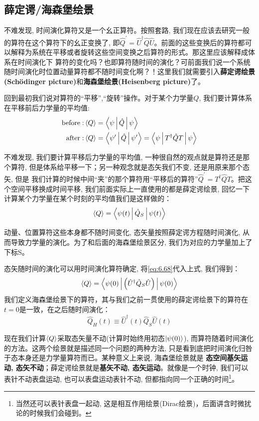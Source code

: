 \documentclass[a4paper,zihao=-4,linespread=1]{ctexrep}
\begin{document}
    \subsection{薛定谔/海森堡绘景}
    不难发现, 时间演化算符又是一个幺正算符。按照套路, 我们现在应该去研究一般的算符在这个算符下的幺正变换了, 即$\hat Q^\prime=\hat{U}^\dagger\hat{Q}\hat{U}$。前面的这些变换后的算符都可以解释为系统在平移或者旋转这些空间变换之后算符的形式。那这里应该解释成体系在时间演化下
    算符的变化吗？也即算符随时间的演化？可前面我们说一个系统随时间演化时位置动量算符都不随时间变化啊？！这里我们就需要引入\textbf{薛定谔绘景(Sch\"odinger picture)}和\textbf{海森堡绘景(Heisenberg picture)}了。
    
    回到最初我们说对算符的“平移”,“旋转”操作。对于某个力学量$Q$, 我们要计算体系在平移前后力学量的平均值:
    \begin{align*}
        \text{before}:&\braket{Q}=\Braket{\psi|\hat{Q}|\psi}\\
        \text{after}:&\braket{Q}=\Braket{\psi^\prime|\hat{Q}|\psi^\prime}=\Braket{\psi|T^\dagger\hat{Q}T|\psi}
    \end{align*}
    
    不难发现, 我们要计算平移后力学量的平均值, 一种很自然的观点就是算符还是那个算符, 但是体系给平移一下；另一种观念就是态矢我们不变, 还是用原来那个态矢, 但是
    我们计算的时候中间“夹”的那个算符用“平移后的算符”$\hat{Q}^\prime=T^\dagger\hat{Q}T$。把这个空间平移换成时间平移, 我们前面实际上一直使用的都是薛定谔绘景, 
    回忆一下计算某个力学量在某个时刻的平均值我们是这样做的：
    \[\braket{Q}=\Braket{\psi(t)|\hat{Q}_S|\psi(t)}\]
    
    动量、位置算符这些本身都不随时间变化, 态矢量按照薛定谔方程随时间演化, 从而导致力学量的演化。为了和后面的海森堡绘景区分, 我们为对应的力学量加上了下标S。

    态矢随时间的演化可以用时间演化算符确定, 将\ref{eq:6.68}代入上式, 我们得到：
    \[\braket{Q}=\Braket{\psi(0)|\left(\hat{U}^\dagger\hat{Q}_S\hat{U}\right)|\psi(0)}\]
    我们定义海森堡绘景下的算符，其与我们之前一贯使用的薛定谔绘景下的算符在$t=0$是一致，在之后随时间演化：
    \begin{equation}
        \label{eq:6.71}
        \boxed{
        \hat{Q}_H(t)\equiv\hat{U}^\dagger(t)\hat{Q}_S\hat{U}(t)}
    \end{equation}
    
    现在我们计算$\braket{Q}$采取态矢量不动(计算时始终用初态$\ket{\psi(0)}$), 而算符随着时间演化的方法。这两个绘景就是描述同一个问题的两种方法, 只是看到底把时间演化归咎于态本身还是力学量算符而已。某种意义上来说, 海森堡绘景就是
    \textbf{态空间基矢运动, 态矢不动}；薛定谔绘景就是\textbf{基矢不动, 态矢运动}。就像是一个时钟, 我们可以表针不动表盘运动, 也可以表盘运动表针不动, 但都指向同一个正确的时间\footnote{当然还可以表针表盘一起动, 这是相互作用绘景(Dirac绘景)，后面讲含时微扰论的时候我们会碰到。}。
    
\end{document}
